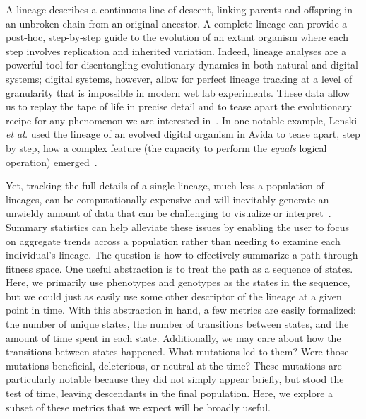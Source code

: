 \documentclass[letterpaper]{article}
\begin{document}
A lineage describes a continuous line of descent, linking parents and offspring in an unbroken chain from an original ancestor.
A complete lineage can provide a post-hoc, step-by-step guide to the evolution of an extant organism where each step involves replication and inherited variation. Indeed, lineage analyses are a powerful tool for disentangling evolutionary dynamics in both natural and digital systems; digital systems, however, allow for perfect lineage tracking at a level of granularity that is impossible in modern wet lab experiments.  These data allow us to replay the tape of life in precise detail and to tease apart the evolutionary recipe for any phenomenon we are interested in~\citep{mcphee_using_2016}. 
In one notable example, Lenski \textit{et al.} used the lineage of an evolved digital organism in Avida to tease apart, step by step, how a complex feature (the capacity to perform the \textit{equals} logical operation) emerged~\citep{lenski_evolutionary_2003}. 

Yet, tracking the full details of a single lineage, much less a population of lineages, can be computationally expensive and will inevitably generate an unwieldy amount of data that can be challenging to visualize or interpret~\citep{mcphee_visualizing_2016}. Summary statistics can help alleviate these issues by enabling the user to focus on aggregate trends across a population rather than needing to examine each individual's lineage. The question is how to effectively summarize a path through fitness space. One useful abstraction is to treat the path as a sequence of states. Here, we primarily use phenotypes and genotypes as the states in the sequence, but we could just as easily use some other descriptor of the lineage at a given point in time. With this abstraction in hand, a few metrics are easily formalized: the number of unique states, the number of transitions between states, and the amount of time spent in each state. Additionally, we may care about how the transitions between states happened. What mutations led to them? Were those mutations beneficial, deleterious, or neutral at the time? These mutations are particularly notable because they did not simply appear briefly, but stood the test of time, leaving descendants in the final population. Here, we explore a subset of these metrics that we expect will be broadly useful.
\end{document}
